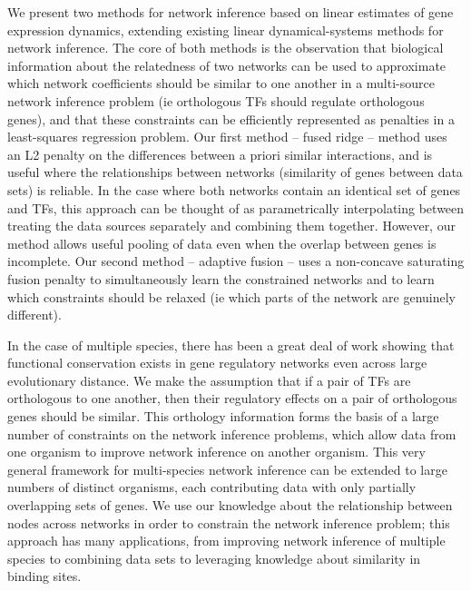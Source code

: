 \documentclass[11pt]{article}
\begin{document}
We present two methods for network inference based on linear estimates of gene expression dynamics, extending existing linear dynamical-systems methods for network inference. The core of both methods is the observation that biological information about the relatedness of two networks can be used to approximate which network coefficients should be similar to one another in a multi-source network inference problem (ie orthologous TFs should regulate orthologous genes), and that these constraints can be efficiently represented as penalties in a least-squares regression problem. Our first method -- fused ridge -- method uses an L2 penalty on the differences between a priori similar interactions, and is useful where the relationships between networks (similarity of genes between data sets) is reliable. In the case where both networks contain an identical set of genes and TFs, this approach can be thought of as parametrically interpolating between treating the data sources separately and combining them together. However, our method allows useful pooling of data even when the overlap between genes is incomplete. Our second method -- adaptive fusion -- uses a non-concave saturating fusion penalty to simultaneously learn the constrained networks and to learn which constraints should be relaxed (ie which parts of the network are genuinely different). 

In the case of multiple species, there has been a great deal of work showing that functional conservation exists in gene regulatory networks even across large evolutionary distance. We make the assumption that if a pair of TFs are orthologous to one another, then their regulatory effects on a pair of orthologous genes should be similar. This orthology information forms the basis of a large number of constraints on the network inference problems, which allow data from one organism to improve network inference on another organism. This very general framework for multi-species network inference can be extended to large numbers of distinct organisms, each contributing data with only partially overlapping sets of genes. We use our knowledge about the relationship between nodes across networks in order to constrain the network inference problem; this approach has many applications, from improving network inference of multiple species to combining data sets to leveraging knowledge about similarity in binding sites. 
\end{document}
